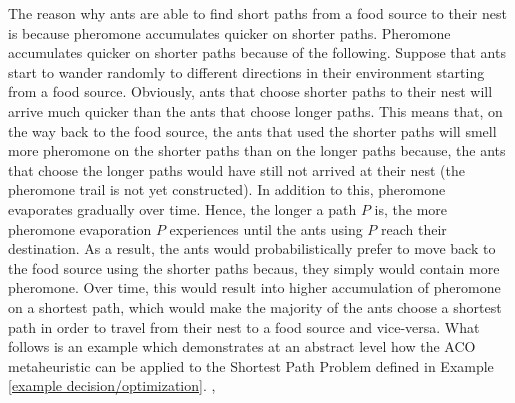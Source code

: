 \documentclass[12pt]{article}
\numberwithin{equation}{subsection}
\numberwithin{table}{subsection}
\numberwithin{algorithm}{subsection}
\numberwithin{figure}{subsection}
\begin{document}
The reason why ants are able to find short paths from a food source to their nest is because pheromone accumulates quicker on shorter paths. Pheromone accumulates quicker on shorter paths because of the following. Suppose that ants start to wander randomly to different directions in their environment starting from a food source. Obviously, ants that choose shorter paths to their nest will arrive much quicker than the ants that choose longer paths. This means that, on the way back to the food source, the ants that used the shorter paths will smell more pheromone on the shorter paths than on the longer paths because, the ants that choose the longer paths would have still not arrived at their nest (the pheromone trail is not yet constructed). In addition to this, pheromone evaporates gradually over time. Hence, the longer a path $P$ is, the more pheromone evaporation $P$ experiences until the ants using $P$ reach their destination. As a result, the ants would probabilistically prefer to move back to the food source using the shorter paths becaus, they simply would contain more pheromone. Over time, this would result into higher accumulation of pheromone on a shortest path, which would make the majority of the ants choose a shortest path in order to travel from their nest to a food source and vice-versa. What follows is an example which demonstrates at an abstract level how the ACO metaheuristic can be applied to the Shortest Path Problem defined in Example \ref{example decision/optimization}. \cite{dorigo_gambardella_1997}, \cite{dorigo_stutzle_thomas_2004}\\
\end{document}

